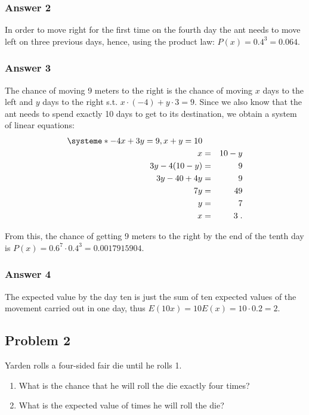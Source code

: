 \documentclass[11pt]{article}
\begin{document}
\subsubsection{Answer 2}
\label{sec:orgheadline2}
In order to move right for the first time on the fourth day the ant needs
to move left on three previous days, hence, using the product law:
\(P(x) = 0.4^3 = 0.064\).

\subsubsection{Answer 3}
\label{sec:orgheadline3}
The chance of moving 9 meters to the right is the chance of moving \(x\)
days to the left and \(y\) days to the right s.t. \(x \cdot (-4) + y \cdot 3 = 9\).
Since we also know that the ant needs to spend exactly 10 days to get
to its destination, we obtain a system of linear equations:
\begin{eqnarray*}
  \systeme*{-4x + 3y = 9, x + y = 10} \\
  x              &=& 10 - y \\
  3y - 4(10 - y) &=& 9 \\
  3y - 40 + 4y   &=& 9 \\
  7y             &=& 49 \\
  y              &=& 7 \\
  x              &=& 3\;.
\end{eqnarray*}

From this, the chance of getting 9 meters to the right by the end of
the tenth day is \(P(x) = 0.6^7 \cdot 0.4^3 = \num{0.0017915904}\).

\subsubsection{Answer 4}
\label{sec:orgheadline4}
The expected value by the day ten is just the sum of ten expected values of
the movement carried out in one day, thus \(E(10x) = 10E(x) = 10 \cdot 0.2 =
    2\).

\subsection{Problem 2}
\label{sec:orgheadline10}
Yarden rolls a four-sided fair die until he rolls 1.
\begin{enumerate}
\item What is the chance that he will roll the die exactly four times?
\item What is the expected value of times he will roll the die?
\end{enumerate}
\end{document}
